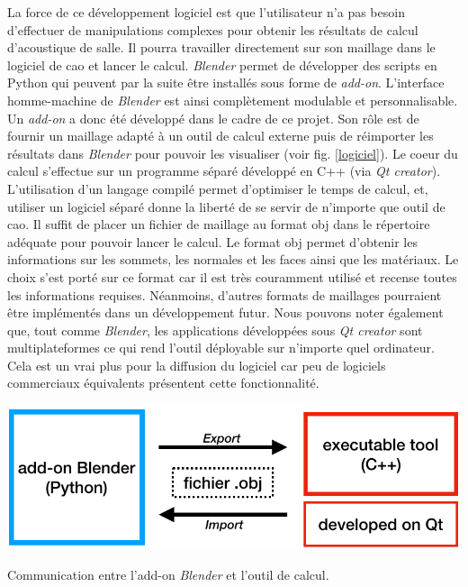 La force de ce développement logiciel est que l'utilisateur n'a pas besoin d'effectuer de manipulations complexes pour obtenir les résultats de calcul d'acoustique de salle. Il pourra travailler directement sur son maillage dans le logiciel de \gls{cao} et lancer le calcul. \textit{Blender} permet de développer des scripts en Python qui peuvent par la suite être installés sous forme de \textit{add-on}. L'interface homme-machine de \textit{Blender} est ainsi complètement modulable et personnalisable. Un \textit{add-on} a donc été développé dans le cadre de ce projet. Son rôle est de fournir un maillage adapté à un outil de calcul externe puis de réimporter les résultats dans \textit{Blender} pour pouvoir les visualiser (voir fig. \ref{logiciel}). Le coeur du calcul s'effectue sur un programme séparé développé en C++ (via \textit{Qt creator}). L'utilisation d'un langage compilé permet d'optimiser le temps de calcul, et, utiliser un logiciel séparé donne la liberté de se servir de n'importe que outil de \gls{cao}. Il suffit de placer un fichier de maillage au format \gls{obj} dans le répertoire adéquate pour pouvoir lancer le calcul. Le format \gls{obj} permet d'obtenir les informations sur les sommets, les normales et les faces ainsi que les matériaux. Le choix s'est porté sur ce format car il est très couramment utilisé et recense toutes les informations requises. Néanmoins, d'autres formats de maillages pourraient être implémentés dans un développement futur. Nous pouvons noter également que, tout comme \textit{Blender}, les applications développées sous \textit{Qt creator} sont multiplateformes ce qui rend l'outil déployable sur n'importe quel ordinateur. Cela est un vrai plus pour la diffusion du logiciel car peu de logiciels commerciaux équivalents présentent cette fonctionnalité. 

\begin{figureth}
	\includegraphics[width=0.7\linewidth]{images/logiciel}
	\caption{Communication entre l'add-on \textit{Blender} et l'outil de calcul.}
	\label{logiciel}
\end{figureth}


